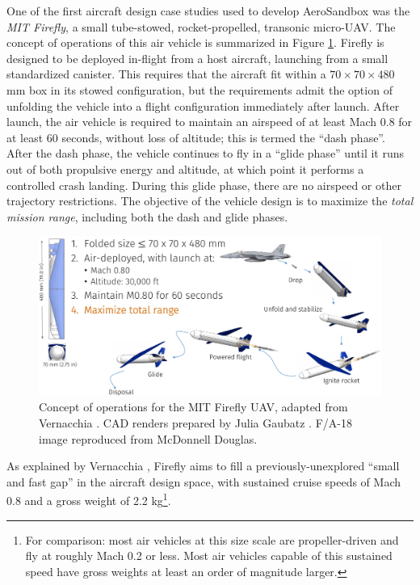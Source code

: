 One of the first aircraft design case studies used to develop AeroSandbox was the \emph{MIT Firefly}, a small tube-stowed, rocket-propelled, transonic micro-UAV. The concept of operations of this air vehicle is summarized in Figure \ref{fig:firefly_conops}. Firefly is designed to be deployed in-flight from a host aircraft, launching from a small standardized canister. This requires that the aircraft fit within a $70 \times 70 \times 480$ mm box in its stowed configuration, but the requirements admit the option of unfolding the vehicle into a flight configuration immediately after launch. After launch, the air vehicle is required to maintain an airspeed of at least Mach 0.8 for at least 60 seconds, without loss of altitude; this is termed the ``dash phase''. After the dash phase, the vehicle continues to fly in a ``glide phase'' until it runs out of both propulsive energy and altitude, at which point it performs a controlled crash landing. During this glide phase, there are no airspeed or other trajectory restrictions. The objective of the vehicle design is to maximize the \emph{total mission range}, including both the dash and glide phases.

\begin{figure}[H]
    \centering
    \includegraphics[width=\textwidth]{../figures/firefly_conops-crop.pdf}
    \caption{Concept of operations for the MIT Firefly UAV, adapted from Vernacchia \cite{vernacchia_development_2020}. CAD renders prepared by Julia Gaubatz \cite{gaubatz_design_2024}. F/A-18 image reproduced from McDonnell Douglas.}
    \label{fig:firefly_conops}
\end{figure}

As explained by Vernacchia \cite{vernacchia_development_2020}, Firefly aims to fill a previously-unexplored ``small and fast gap'' in the aircraft design space, with sustained cruise speeds of Mach 0.8 and a gross weight of 2.2 kg\footnote{For comparison: most air vehicles at this size scale are propeller-driven and fly at roughly Mach 0.2 or less. Most air vehicles capable of this sustained speed have gross weights at least an order of magnitude larger.}.

